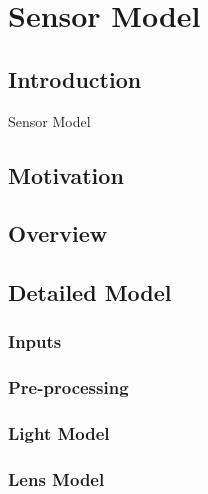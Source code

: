 \newpage
\section{Sensor Model}




\subsection{Introduction} %
 Sensor Model 



\subsection{Motivation} %
\blindtext



\subsection{Overview} %
\blindtext





\subsection{Detailed Model}
\blindtext

\subsubsection{Inputs}
\blindtext

\subsubsection{Pre-processing} %
\blindtext

\subsubsection{Light Model}
\blindtext

\subsubsection{Lens Model} %
\blindtext

